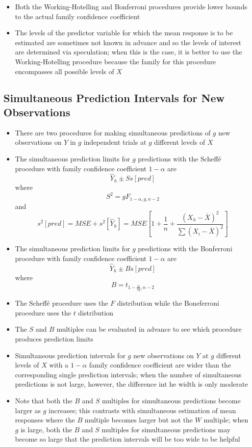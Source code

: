 \begin{itemize}
\item Both the Working-Hotelling and Bonferroni procedures provide lower bounds to the actual family confidence coefficient 
\item The levels of the predictor variable for which the mean response is to be estimated are sometimes not known in advance and so the levels of interest are determined via speculation; when this is the case, it is better to use the Working-Hotelling procedure because the family for this procedure encompasses all possible levels of $X$
\end{itemize}

\subsection{Simultaneous Prediction Intervals for New Observations}
\begin{itemize}
\item There are two procedures for making simultaneous predictions of $g$ new observations on $Y$ in $g$ independent trials at $g$ different levels of $X$ 
\item The simultaneous prediction limits for $g$ predictions with the Scheffé procedure with family confidence coefficient $1-\alpha$ are $$ \hat{Y}_h \pm Ss[pred] $$ where $$ S^2 = gF_{1-\alpha, g, n-2} $$ and $$ s^2[pred] = MSE + s^2[\hat{Y}_h] = MSE \left[1 + \frac{1}{n} + \frac{(X_h - \overline{X})^2}{\sum (X_i - \overline{X})^2}\right]  $$  
\item The simultaneous prediction limits for $g$ predictions with the Bonferroni procedure with family confidence coefficient $1-\alpha$ are $$ \hat{Y}_h \pm Bs[pred] $$ where $$ B = t_{1-\frac{\alpha}{2g}, n-2} $$ 
\item The Scheffé procedure uses the $F$ distribution while the Boneferroni procedure uses the $t$ distribution
\item The $S$ and $B$ multiples can be evaluated in advance to see which procedure produces prediction limits
\item Simultaneous prediction intervals for $g$ new observations on $Y$ at $g$ different levels of $X$ with a $1-\alpha$ family confidence coefficient are wider than the corresponding single prediction intervals; when the number of simultaneous predictions is not large, however, the difference int he width is only moderate
\item Note that both the $B$ and $S$ multiples for simultaneous predictions become larger as $g$  increases; this contrasts with simultaneous estimation of mean responses where the $B$ multiple becomes larger but not the $W$ multiple; when $g$ is large, both the $B$ and $S$ multiples for simultaneous predictions may become so large that the prediction intervals will be too wide to be helpful 
\end{itemize} 


